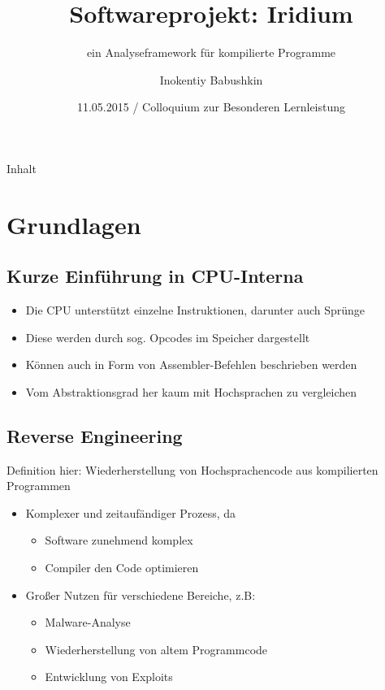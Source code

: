 \documentclass{beamer}
\title{Softwareprojekt: Iridium}
\subtitle{ein Analyseframework für kompilierte Programme}
\author{Inokentiy Babushkin}
\institute{Abteigymnasium Brauweiler}
\date{11.05.2015 / Colloquium zur Besonderen Lernleistung}
\begin{document}
\begin{frame}
  \titlepage
\end{frame}

\begin{frame}{Inhalt}
  \tableofcontents
\end{frame}

\section{Grundlagen}

\subsection{Kurze Einführung in CPU-Interna}

\begin{frame}
  \begin{itemize}
    \item Die CPU unterstützt einzelne Instruktionen, darunter auch Sprünge
    \item Diese werden durch sog. Opcodes im Speicher dargestellt
    \item Können auch in Form von Assembler-Befehlen beschrieben werden
    \item Vom Abstraktionsgrad her kaum mit Hochsprachen zu vergleichen
  \end{itemize}
\end{frame}

\subsection{Reverse Engineering}

\begin{frame}{Definition hier: Wiederherstellung von Hochsprachencode aus kompilierten Programmen}
  \begin{itemize}
  \item Komplexer und zeitaufändiger Prozess, da
    \begin{itemize}
    \item Software zunehmend komplex
    \item Compiler den Code optimieren
    \end{itemize}
  \item Großer Nutzen für verschiedene Bereiche, z.B:
    \begin{itemize}
    \item Malware-Analyse
    \item Wiederherstellung von altem Programmcode
    \item Entwicklung von Exploits
    \end{itemize}
  \end{itemize}
\end{frame}
\end{document}
